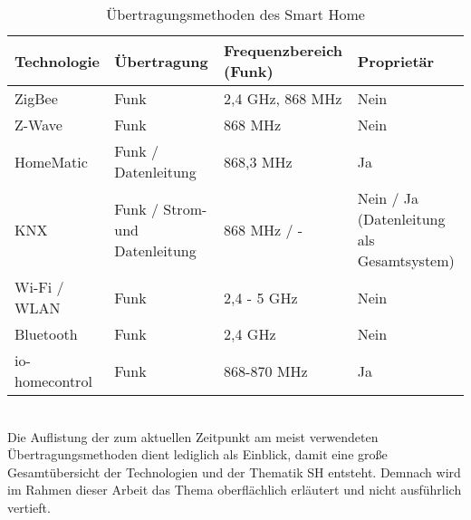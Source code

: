     \begin{table}[hbt!]
        \begin{center}
            \begin{tabular}{| p{3.25cm} | p{3.25cm} | p{3.25cm} | p{3.25cm} |}
                \hline
                    \textbf{Technologie} & \textbf{Übertragung} & \textbf{Frequenzbereich (Funk)} & \textbf{Proprietär} \\
                \hline
                    ZigBee & Funk & 2,4 GHz, 868 MHz & Nein \\ 
                \hline
                    Z-Wave & Funk & 868 MHz & Nein \\ 
                \hline
                    HomeMatic & Funk / Datenleitung & 868,3 MHz & Ja \\
                \hline
                    KNX & Funk / Strom- und Datenleitung & 868 MHz / - & Nein / Ja (Datenleitung als Gesamtsystem) \\
                \hline
                    Wi-Fi / WLAN & Funk & 2,4 - 5 GHz & Nein \\
                \hline 
                    Bluetooth & Funk & 2,4 GHz & Nein \\
                \hline
                    io-homecontrol & Funk & 868-870 MHz & Ja \\
                \hline
            \end{tabular}
        \end{center}
        \caption{Übertragungsmethoden des Smart Home}
        \label{tab:protocolsSH}
    \end{table}
    \\
    Die Auflistung der zum aktuellen Zeitpunkt am meist verwendeten Übertragungsmethoden dient 
    lediglich als Einblick, damit eine große Gesamtübersicht der Technologien und der Thematik \acl{SH} entsteht. 
    Demnach wird im Rahmen dieser Arbeit das Thema oberflächlich erläutert und nicht ausführlich vertieft.


